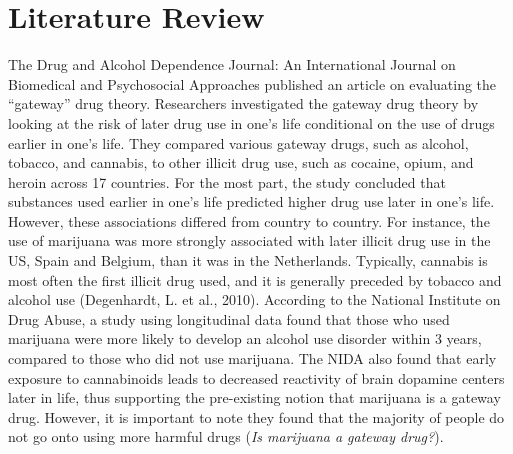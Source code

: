 \documentclass{article}
\begin{document}
\section{Literature Review}
\vspace*{-2mm}
The Drug and Alcohol Dependence Journal: An International Journal on Biomedical and Psychosocial Approaches published an article on evaluating the “gateway” drug theory. Researchers investigated the gateway drug theory by looking at the risk of later drug use in one’s life conditional on the use of drugs earlier in one’s life. They compared various gateway drugs, such as alcohol, tobacco, and cannabis, to other illicit drug use, such as cocaine, opium, and heroin across 17 countries. For the most part, the study concluded that substances used earlier in one’s life predicted higher drug use later in one’s life. However, these associations differed from country to country. For instance, the use of marijuana was more strongly associated with later illicit drug use in the US, Spain and Belgium, than it was in the Netherlands. Typically, cannabis is most often the first illicit drug used, and it is generally preceded by tobacco and alcohol use (Degenhardt, L. et al., 2010).  
According to the National Institute on Drug Abuse, a study using longitudinal data found that those who used marijuana were more likely to develop an alcohol use disorder within 3 years, compared to those who did not use marijuana. The NIDA also found that early exposure to cannabinoids leads to decreased reactivity of brain dopamine centers later in life, thus supporting the pre-existing notion that marijuana is a gateway drug. However, it is important to note they found that the majority of people do not go onto using more harmful drugs ({\it Is marijuana a gateway drug?}).
\end{document}
